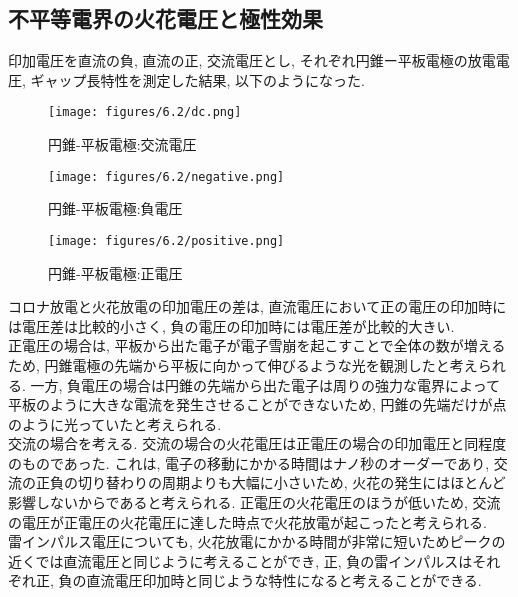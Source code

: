 \documentclass{ltjsarticle}
\begin{document}
\subsection{不平等電界の火花電圧と極性効果}
印加電圧を直流の負, 直流の正, 交流電圧とし, それぞれ円錐ー平板電極の放電電圧, ギャップ長特性を測定した結果, 以下のようになった. 

\begin{figure}[H]
    \centering
    \begin{minipage}[b]{0.48\textwidth}
      \texttt{[image: figures/6.2/dc.png]}
      \caption{円錐-平板電極:交流電圧}
    \end{minipage}
    \hfill
    \begin{minipage}[b]{0.48\textwidth}
      \texttt{[image: figures/6.2/negative.png]}
      \caption{円錐-平板電極:負電圧}
    \end{minipage}
\end{figure}

\begin{figure}[H]
    \begin{center}
        \texttt{[image: figures/6.2/positive.png]}
        \caption{円錐-平板電極:正電圧}
    \end{center}
\end{figure}

コロナ放電と火花放電の印加電圧の差は, 直流電圧において正の電圧の印加時には電圧差は比較的小さく, 負の電圧の印加時には電圧差が比較的大きい. \\

正電圧の場合は, 平板から出た電子が電子雪崩を起こすことで全体の数が増えるため, 円錐電極の先端から平板に向かって伸びるような光を観測したと考えられる. 一方, 負電圧の場合は円錐の先端から出た電子は周りの強力な電界によって平板のように大きな電流を発生させることができないため, 円錐の先端だけが点のように光っていたと考えられる. \\

交流の場合を考える. 交流の場合の火花電圧は正電圧の場合の印加電圧と同程度のものであった. これは, 電子の移動にかかる時間はナノ秒のオーダーであり, 交流の正負の切り替わりの周期よりも大幅に小さいため, 火花の発生にはほとんど影響しないからであると考えられる. 正電圧の火花電圧のほうが低いため, 交流の電圧が正電圧の火花電圧に達した時点で火花放電が起こったと考えられる. \\

雷インパルス電圧についても, 火花放電にかかる時間が非常に短いためピークの近くでは直流電圧と同じように考えることができ, 正, 負の雷インパルスはそれぞれ正, 負の直流電圧印加時と同じような特性になると考えることができる. \\
\end{document}
